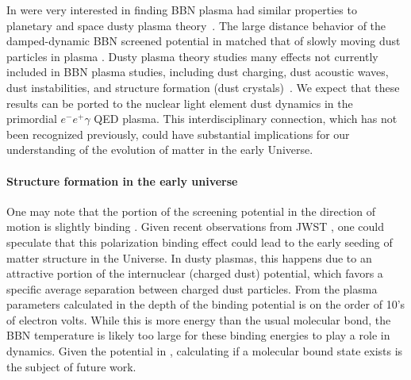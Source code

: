  
In \cite{Grayson:2023flr} were very interested in finding BBN plasma had similar properties to planetary and space dusty plasma theory~\cite{Montgomery:1970jpp,Stenflo:1973,Shukla:2002ppcf,Lampe:2000pop}. The large distance behavior of the damped-dynamic BBN screened potential in  matched that of slowly moving dust particles in plasma \cite{Stenflo:1973}. Dusty plasma theory studies many effects not currently included in BBN plasma studies, including dust charging, dust acoustic waves, dust instabilities, and structure formation (dust crystals)~\cite{Shukla:2002ppcf}. We expect that these results can be ported to the nuclear light element dust dynamics in the primordial $e^-e^+\gamma$ QED plasma. This interdisciplinary connection, which has not been recognized previously, could have substantial implications for our understanding of the evolution of matter in the early Universe.

\paragraph{Structure formation in the early universe}
One may note that the portion of the screening potential in the direction of motion is slightly binding .
Given recent observations from JWST \cite{Ferreira:2023jwst}, one could speculate that this polarization binding effect could lead to the early seeding of matter structure in the Universe. In dusty plasmas, this happens due to an attractive portion of the internuclear (charged dust) potential, which favors a specific average separation between charged dust particles. From the plasma parameters calculated in \cite{Grayson:2023flr} the depth of the binding potential is on the order of 10's of electron volts. While this is more energy than the usual molecular bond, the BBN temperature is likely too large for these binding energies to play a role in dynamics. Given the potential in , calculating if a molecular bound state exists is the subject of future work.


